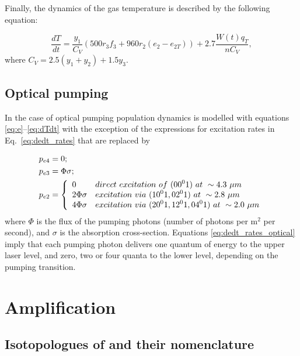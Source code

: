 Finally, the dynamics of the gas temperature is described by the following equation:

\begin{equation}\label{eq:dTdt}
\frac{dT}{dt} = \frac{y_1}{C_V}(500r_3f_3 + 960r_2(e_2-e_{2T})) + 2.7\frac{W(t)q_T}{nC_V},
\end{equation}
where $C_V = 2.5(y_1+y_2) + 1.5y_3$.


\subsection{Optical pumping}
In the case of optical pumping population dynamics is modelled with equations \ref{eq:e}--\ref{eq:dTdt} with the exception of the expressions for excitation rates in Eq.~\ref{eq:dedt_rates} that are replaced by

\begin{equation}\label{eq:dedt_rates_optical}
\begin{aligned}
&p_{e4} = 0;\\
&p_{e3} = \Phi \sigma;\\
&p_{e2} = \left\{
  \begin{array}{>{\displaystyle}l>{\displaystyle}l}
  0             & direct~excitation~of~(00^01)~at~\sim4.3~{\mu}m\\
  2 \Phi \sigma & excitation~via~(10^01, 02^01)~at~\sim2.8~{\mu}m\\
  4 \Phi \sigma & excitation~via~(20^01, 12^01, 04^01)~at~\sim2.0~{\mu}m
  \end{array}
  \right.
\end{aligned}
\end{equation}
where $\Phi$ is the flux of the pumping photons (number of photons per $\text{m}^2$ per second), and $\sigma$ is the absorption cross-section. Equations \ref{eq:dedt_rates_optical} imply that each pumping photon delivers one quantum of energy to the upper laser level, and zero, two or four quanta to the lower level, depending on the pumping transition.


\section{Amplification}


\subsection{Isotopologues of  and their nomenclature}

